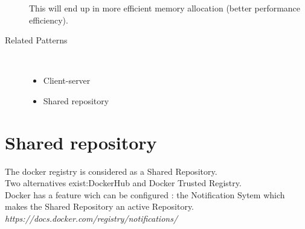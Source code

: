 \begin{description}
This will end up in more efficient memory allocation (better performance efficiency).

\item [Related Patterns]~
\begin{itemize}
	\item Client-server
	\item Shared repository
\end{itemize}
\end{description}



\section{Shared repository}

The docker registry is considered as a Shared Repository. \\
Two alternatives exist:DockerHub and Docker Trusted Registry. \\

Docker has a feature wich can be configured : the Notification Sytem which makes the Shared Repository an active Repository.
\textit{https://docs.docker.com/registry/notifications/}

